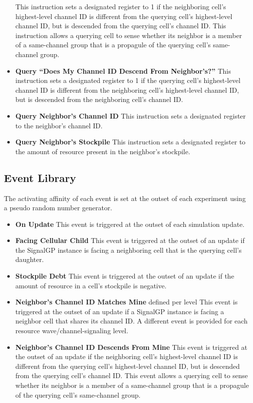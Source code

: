 \begin{itemize}
This instruction sets a designated register to 1 if the neighboring cell's highest-level channel ID is different from the querying cell's highest-level channel ID, but is descended from the querying cell's channel ID.
This instruction allows a querying cell to sense whether its neighbor is a member of a same-channel group that is a propagule of the querying cell's same-channel group.
\item \textbf{Query ``Does My Channel ID Descend From Neighbor's?''}
This instruction sets a designated register to 1 if the querying cell's highest-level channel ID is different from the neighboring cell's highest-level channel ID, but is descended from the neighboring cell's channel ID.
\item \textbf{Query Neighbor's Channel ID}
This instruction sets a designated register to the neighbor's channel ID.
\item \textbf{Query Neighbor's Stockpile}
This instruction sets a designated register to the amount of resource present in the neighbor's stockpile.
\end{itemize}

\subsection{Event Library}

The activating affinity of each event is set at the outset of each experiment using a pseudo random number generator.

\begin{itemize}
\item \textbf{On Update}
This event is triggered at the outset of each simulation update.
\item \textbf{Facing Cellular Child}
This event is triggered at the outset of an update if the SignalGP instance is facing a neighboring cell that is the querying cell's daughter.
\item \textbf{Stockpile Debt}
This event is triggered at the outset of an update if the amount of resource in a cell's stockpile is negative.
\item \textbf{Neighbor's Channel ID Matches Mine} defined per level
This event is triggered at the outset of an update if a SignalGP instance is facing a neighbor cell that shares its channel ID.
A different event is provided for each resource wave/channel-signaling level.
\item \textbf{Neighbor's Channel ID Descends From Mine}
This event is triggered at the outset of an update if the neighboring cell's highest-level channel ID is different from the querying cell's highest-level channel ID, but is descended from the querying cell's channel ID.
This event allows a querying cell to sense whether its neighbor is a member of a same-channel group that is a propagule of the querying cell's same-channel group.
\end{itemize}

